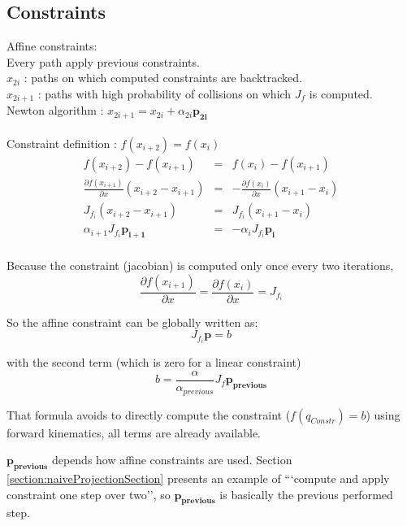 \documentclass {article}
\newcommand\p{\mathbf{p_i}}
\newcommand\Jfi{J_{f_i}}
\begin{document}
\subsection{Constraints}
Affine constraints: \\
Every path apply previous constraints. \\
$x_{2i}$ : paths on which computed constraints are backtracked. \\
$x_{2i+1}$ : paths with high probability of collisions on which $J_f$ is
computed. \\
Newton algorithm : $ x_{2i+1} = x_{2i} + \alpha_{2i} \mathbf{p_{2i}} $ \\
\\
Constraint definition : $ f(x_{i+2}) = f(x_{i}) $ \\
\begin{eqnarray}
f(x_{i+2}) - f(x_{i+1}) &=& f(x_i) - f(x_{i+1}) \\
\frac{\partial{f(x_{i+1})}}{\partial{x}}(x_{i+2}-x_{i+1}) &=&
-\frac{\partial{f(x_{i})}}{\partial{x}}(x_{i+1}-x_{i})\\
\Jfi(x_{i+2}-x_{i+1}) &=& \Jfi(x_{i+1}-x_i) \\
\alpha_{i+1} \Jfi \mathbf{p_{i+1}} &=& - \alpha_i \Jfi  \p \ \ \  \\
\end{eqnarray}

Because the constraint (jacobian) is computed only once every two iterations,
$$\frac{\partial{f(x_{i+1})}}{\partial{x}} = \frac{\partial{f(x_{i})}}
{\partial{x}} = \Jfi$$

So the affine constraint can be globally written as:
$$ \Jfi \mathbf{p} = b $$

with the second term (which is zero for a linear constraint)
$$ b = \frac{\alpha}{\alpha_{previous}} J_{f} \mathbf{p_{previous}}$$

That formula avoids to directly compute the constraint ($f(q_{Constr}) = b$)
using forward kinematics, all terms are already available.

$ \mathbf{p_{previous}} $ depends how affine constraints are used. Section
\ref{section:naiveProjectionSection} presents an example of ```compute and apply
constraint one step over two'', so $ \mathbf{p_{previous}} $ is basically the
previous performed step.
\end{document}
